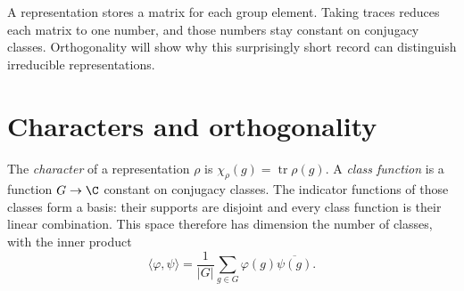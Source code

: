 A representation stores a matrix for each group element. Taking traces reduces each matrix to one number, and those numbers stay constant on conjugacy classes. Orthogonality will show why this surprisingly short record can distinguish irreducible representations.

\section{Characters and orthogonality}

\begin{definition}
The \emph{character} of a representation $\rho$ is $\chi_\rho(g)=\operatorname{tr}\rho(g)$. A \emph{class function} is a function $G\to\C$ constant on conjugacy classes. The indicator functions of those classes form a basis: their supports are disjoint and every class function is their linear combination. This space therefore has dimension the number of classes, with the inner product
\[
\langle\varphi,\psi\rangle=\frac1{|G|}\sum_{g\in G}\varphi(g)\overline{\psi(g)}.
\]
\end{definition}

